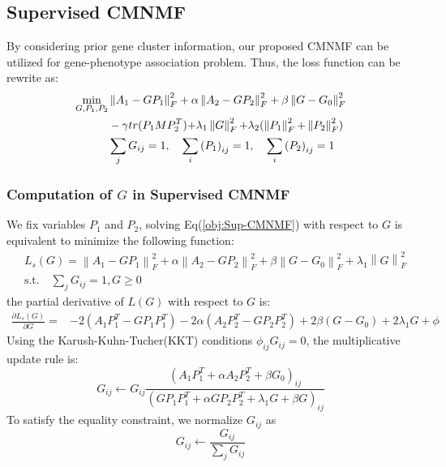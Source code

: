\documentclass{bmcart}
\begin{document}
\subsection*{Supervised CMNMF}
By considering prior gene cluster information, our proposed CMNMF can be utilized for gene-phenotype association problem. Thus, the loss function can be rewrite as:
\begin{equation}\label{obj:Sup-CMNMF}
\begin{split}
\mathop {\min }\limits_{G,{P_1},{P_2}}
&\left\| {{A_1} - G{P_1}} \right\|_F^2 + \alpha \left\| {{A_2} - G{P_2}} \right\|_F^2 +\beta\left\| {G - {G_0}}\right\|_F^2\\
&- \gamma tr({P_1}MP_2^T){\rm{ + }}{\lambda _1}\left\| G \right\|_F^2{\rm{ + }}{\lambda _2}(\left\| {{P_1}} \right\|_F^2{\rm{ + }}\left\| {{P_2}} \right\|_F^2)\\
&\sum_jG_{ij}=1,\quad \sum_i{(P_1)}_{ij}=1,\quad \sum_i{(P_2)}_{ij}=1
\end{split}
\end{equation}

\subsubsection*{Computation of $G$ in Supervised CMNMF}
We fix variables $P_1$ and $P_2$, solving Eq(\ref{obj:Sup-CMNMF}) with respect to $G$ is equivalent to minimize the following function:
\begin{equation}\label{obj:sup_G}\nonumber
\begin{split}
&L_{s}(G)=\left\| {{A_1} - GP_1} \right\|_F^2 + \alpha \left\| {{A_2} - G{P_2}} \right\|_F^2
     +\beta\left\| {G - {G_0}}\right\|_F^2+{\lambda _1}\left\| G \right\|_F^2\\
     &\mathrm{s.t. }\quad \sum_jG_{ij}=1,G\ge 0
\end{split}
\end{equation}
the partial derivative of $L(G)$ with respect to $G$ is:
\begin{equation}\label{equ:G_gradient}\nonumber
\begin{split}
\frac{\partial{L_s(G)}}{\partial{G}}=
&-2(A_1{P_1^T} - G{P_1}{P_1^T})-2\alpha(A_2{P_2^T} - G{P_2}{P_2^T})+2\beta(G-G_0)+2\lambda_1G+\phi
\end{split}
\end{equation}
Using the Karush-Kuhn-Tucher(KKT) conditions $\phi_{ij}G_{ij}=0$, the multiplicative update rule is:
\begin{equation}\label{equ:updating_G}\nonumber
G_{ij}\leftarrow G_{ij}
\frac{(A_1P_1^T+\alpha A_2P_2^T+\beta G_0)_{ij}}
{(GP_1P_1^T+\alpha GP_2P_2^T+\lambda_1G+\beta G)_{ij}}
\end{equation}
To satisfy the equality constraint, we normalize $G_{ij}$ as
\begin{equation}\label{equ:updating_G}\nonumber
G_{ij}\leftarrow \frac{G_{ij}}{\sum_{j}G_{ij}}
\end{equation}
\end{document}
